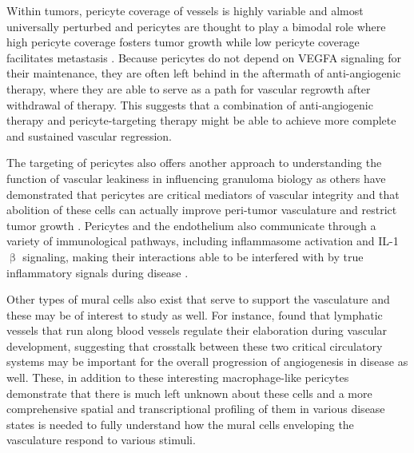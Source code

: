 Within tumors, pericyte coverage of vessels is highly variable and almost universally perturbed and pericytes are thought to play a bimodal role where high pericyte coverage fosters tumor growth while low pericyte coverage facilitates metastasis \citep{Ribeiro2015}. Because pericytes do not depend on VEGFA signaling for their maintenance, they are often left behind in the aftermath of anti-angiogenic therapy, where they are able to serve as a path for vascular regrowth after withdrawal of therapy. This suggests that a combination of anti-angiogenic therapy and pericyte-targeting therapy might be able to achieve more complete and sustained vascular regression. 

The targeting of pericytes also offers another approach to understanding the function of vascular leakiness in influencing granuloma biology as others have demonstrated that pericytes are critical mediators of vascular integrity and that abolition of these cells can actually improve peri-tumor vasculature and restrict tumor growth \citep{Keskin2015}. Pericytes and the endothelium also communicate through a variety of immunological pathways, including inflammasome activation and IL-1$\upbeta$ signaling, making their interactions able to be interfered with by true inflammatory signals during disease \citep{Kozma2021}.

Other types of mural cells also exist that serve to support the vasculature and these may be of interest to study as well. For instance, \citet{Bower2017b} found that lymphatic vessels that run along blood vessels regulate their elaboration during vascular development, suggesting that crosstalk between these two critical circulatory systems may be important for the overall progression of angiogenesis in disease as well. These, in addition to these interesting macrophage-like pericytes demonstrate that there is much left unknown about these cells and a more comprehensive spatial and transcriptional profiling of them in various disease states is needed to fully understand how the mural cells enveloping the vasculature respond to various stimuli.

